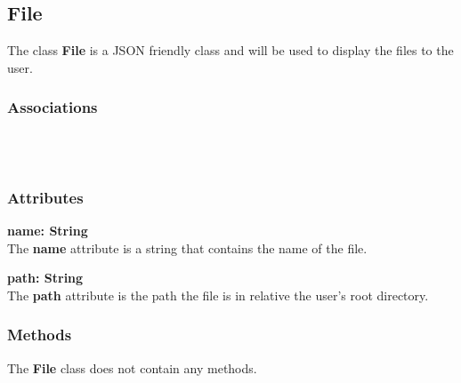 \subsection{File}
The class \textbf{File} is a JSON friendly class and will be used to display the files to the user.

\subsubsection{Associations}
\textbf{} \\

\textbf{} \\

\subsubsection{Attributes}
\textbf{name: String} \\
The \textbf{name} attribute is a string that contains the name of the file.

\textbf{path: String} \\
The \textbf{path} attribute is the path the file is in relative the user's
root directory.

\subsubsection{Methods}
The \textbf{File} class does not contain any methods.

